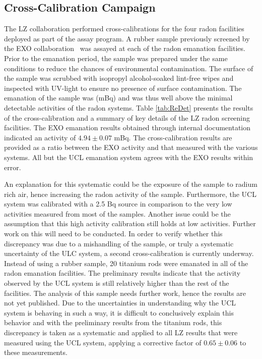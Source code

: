 \subsection{Cross-Calibration Campaign}
\label{secsec:cross_cal}

The LZ collaboration performed cross-calibrations for the four radon facilities deployed as part of the assay program. A rubber sample previously screened by the EXO collaboration~\cite{Albert:2015nta, Miller:2017tpl} was assayed at each of the radon emanation facilities. Prior to the emanation period, the sample was prepared under the same conditions to reduce the chances of environmental contamination. The surface of the sample was scrubbed with isopropyl alcohol-soaked lint-free wipes and inspected with UV-light to ensure no presence of surface contamination. The emanation of the sample was (mBq) and was thus well above the minimal detectable activities of the radon systems. Table \ref{tab:ReDet} presents the results of the cross-calibration and a summary of key details of the LZ radon screening facilities. The EXO emanation results obtained through internal documentation indicated an activity of $4.94\pm0.07$ mBq. The cross-calibration results are provided as a ratio between the EXO activity and that measured with the various systems. All but the UCL emanation system agrees with the EXO results within error.
%

%

An explanation for this systematic could be the exposure of the sample to radium rich air, hence increasing the radon activity of the sample. Furthermore, the UCL system was calibrated with a 2.5 Bq source in comparison to the very low activities measured from most of the samples. Another issue could be the assumption that this high activity calibration still holds at low activities. Further work on this will need to be conducted. In order to verify whether this discrepancy was due to a mishandling of the sample, or truly a systematic uncertainty of the ULC system, a second cross-calibration is currently underway. Instead of using a rubber sample, 20 titanium rods were emanated in all of the radon emanation facilities. The preliminary results indicate that the activity observed by the UCL system is still relatively higher than the rest of the facilities. The analysis of this sample needs further work, hence the results are not yet published. Due to the uncertainties in understanding why the UCL system is behaving in such a way, it is difficult to conclusively explain this behavior and with the preliminary results from the titanium rods, this discrepancy is taken as a systematic and applied to all LZ results that were measured using the UCL system, applying a corrective factor of $0.65\pm0.06$ to these measurements.


